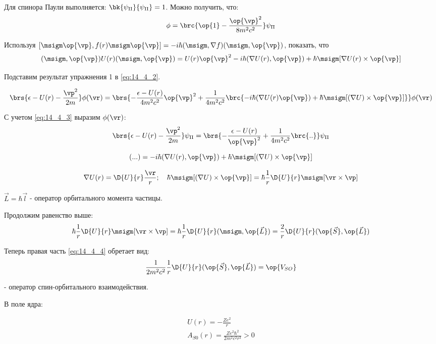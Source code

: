 Для спинора Паули выполняется: $\bk{\psi_\Pi}{\psi_\Pi} = 1$. Можно получить, что:
\begin{equation}
\label{eq:14_4_3}
\phi = \brc{\op{1} - \frac{\op{\vp}^2}{8m^2c^2}} \psi_\Pi
\end{equation}

\begin{excr}
Используя $[\msigm \op{\vp}, f(r) \msigm \op{\vp}] = -i\hbar (\msigm, \nabla f)(\msigm, \op{\vp})$, показать, что
$$
(\msigm, \op{\vp}) U(r) (\msigm, \op{\vp}) = U(r) \op{\vp}^2 - i \hbar (\nabla U(r), \op{\vp}) + \hbar \msigm [\nabla U(r) \times \op{\vp}]
$$
\end{excr}

Подставим результат упражнения 1 в \eqref{eq:14_4_2}.

$$
\brs{\epsilon - U(r) - \frac{{\vp}^2}{2m}}\phi(\vr) = \brs{- \frac{\epsilon - U(r)}{4m^2c^2}\op{\vp}^2 + \frac{1}{4m^2 c^2} \brc{-i\hbar (\nabla U(r) \op{\vp}) + \hbar \msigm [(\nabla U) \times \op{\vp}]}} \phi(\vr)
$$

С учетом \eqref{eq:14_4_3} выразим $\phi(\vr)$:
$$
\brs{\epsilon - U(r) - \frac{{\vp}^2}{2m}}\psi_\Pi = \brs{- \frac{\epsilon - U(r)}{\op{\vp}^2} + \frac{1}{4m^2 c^2} \brc{..}} \psi_\Pi
$$

\begin{equation}
\label{eq:14_4_4}
(...) = -i\hbar (\nabla U(r), \op{\vp}) + \hbar \msigm [(\nabla U) \times \op{\vp}]
\end{equation}

$$
\nabla U(r) = \D{U}{r} \frac{\vr}{r};~~~
\hbar \msigm [(\nabla U) \times \op{\vp}] = \hbar \frac{1}{r} \D{U}{r} \msigm [\vr \times \vp] 
$$

$\vec{L} = \hbar \vec{l}$ - оператор орбитального момента частицы.

Продолжим равенство выше:
$$
\hbar \frac{1}{r} \D{U}{r} \msigm [\vr \times \vp] = {\hbar} \frac{1}{r} \D{U}{r} (\msigm, \op{\vec{L}}) = \frac{2}{r} \D{U}{r} (\op{\vec{S}}, \op{\vec{L}})
$$

Теперь правая часть \eqref{eq:14_4_4} обретает вид: 
$$\frac{1}{2m^2c^2}\frac{1}{r} \D{U}{r} (\op{\vec{S}}, \op{\vec{L}}) = \op{V_{SO}}$$

- оператор спин-орбитального взаимодействия.

В поле ядра:

\begin{gather*}
U(r) = -\frac{Ze^2}{r} \\
\boxed{A_{S0} (r) = \frac{Ze^2 \hbar^2}{2m^2 c^2 r^3} > 0}
\end{gather*}


